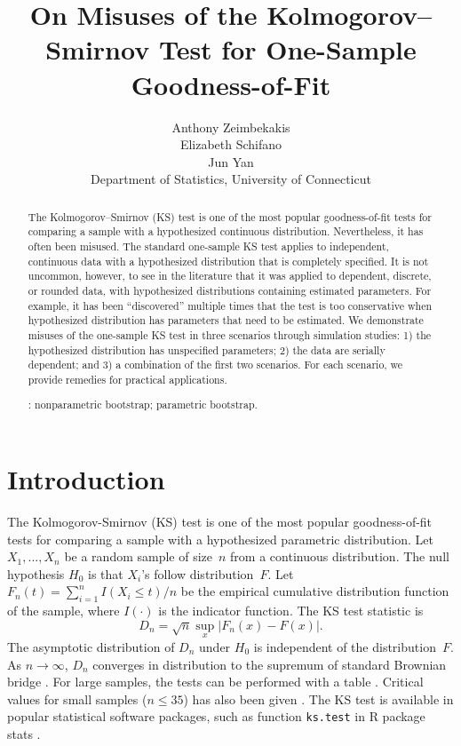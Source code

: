 \documentclass[12pt, letterpaper, titlepage]{article}
\title{On Misuses of the Kolmogorov--Smirnov Test for One-Sample Goodness-of-Fit}
\author{Anthony Zeimbekakis\\
  Elizabeth Schifano\\
  Jun Yan\\[1ex]
  Department of Statistics, University of Connecticut\\
}
\date{}
\begin{document}
\maketitle

\doublespace

\begin{abstract}
The Kolmogorov--Smirnov (KS) test is one of the most popular goodness-of-fit
tests for comparing a sample with a hypothesized continuous distribution.
Nevertheless, it has often been misused. The standard one-sample KS test applies
to independent, continuous data with a hypothesized distribution that is
completely specified. It is not uncommon, however, to see in the literature that
it was applied to dependent, discrete, or rounded data, with hypothesized
distributions containing estimated parameters. For example, it has been
``discovered'' multiple times that the test is too conservative when
hypothesized distribution has parameters that need to be estimated.
We demonstrate misuses of the one-sample KS test in
three scenarios through simulation studies:
1) the hypothesized distribution has unspecified parameters;
2) the data are serially dependent; and
3) a combination of the first two scenarios.
For each scenario, we provide remedies for practical applications.

\bigskip
{}:
nonparametric bootstrap;
parametric bootstrap.
\end{abstract}

\section{Introduction}
\label{sec:intro}

The Kolmogorov-Smirnov (KS) test is one of the most popular goodness-of-fit
tests for comparing a sample with a hypothesized parametric distribution.
Let $X_1, ..., X_n$ be a random sample of size~$n$ from a continuous
distribution. The null hypothesis $H_0$ is that $X_i$'s follow distribution~$F$.
Let $F_n(t) = \sum_{i=1}^n I(X_i \le t) / n$ be the empirical cumulative
distribution function of the sample, where $I(\cdot)$ is the indicator
function. The KS test statistic is
\begin{equation}
  \label{eq:ks_standard}
  D_n = \sqrt{n} \sup_x | F_{n}(x) - F(x) |.
\end{equation}
The asymptotic distribution of $D_n$ under $H_0$ is independent of the
distribution~$F$. As $n \to \infty$, $D_n$ converges in distribution to
the supremum of standard Brownian bridge \citep{kolmogorov1933sulla}. For large
samples, the tests can be performed with a table \citep{smirnov1948table}.
Critical values for small samples ($n \le 35$) has also been given
\citep{Massey}. The KS test is available in popular
statistical software packages, such as function \texttt{ks.test} in R package
\textsf{stats} \citep{R, Marsaglia}.
\end{document}
